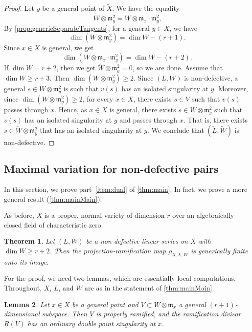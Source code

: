 \documentclass[11pt,reqno]{amsart}
\theoremstyle{plain}
\newtheorem{theorem}{Theorem}[section]
\newtheorem{lemma}[theorem]{Lemma}
\theoremstyle{definition}
\theoremstyle{remark}
\numberwithin{equation}{section}
\numberwithin{equation}{section}
\begin{document}
\begin{proof}
  Let $y$ be a general point of $\widetilde X$.
  We have the equality
  \[ \widetilde W \otimes \mathfrak m_y^2 = W \otimes \mathfrak m_x \cdot \mathfrak m_y^2. \]
  By \autoref{prop:genericSeparateTangents}, for a general $y \in X$, we have
  \[ \dim (W \otimes \mathfrak m_y^2) = \dim W - (r+1).\]
  Since $x \in X$ is general, we get
  \[ \dim (W \otimes \mathfrak m_x \cdot \mathfrak m_y^2) = \dim W - (r+2).\]
  If $\dim W = r+2$, then we get $\widetilde W \otimes \mathfrak m_y^2 = 0$, so we are done.
  Assume that $\dim W \geq r+3$.
  Then $\dim (W \otimes \mathfrak m_y^2) \geq 2$.
  Since $(L, W)$ is non-defective, a general $s \in W \otimes \mathfrak m_y^2$ is such that $v(s)$ has an isolated singularity at $y$.
  Moreover, since $\dim (W \otimes \mathfrak m_y^2) \geq 2$, for every $x \in X$, there exists $s \in V$ such that $v(s)$ passes through $x$.
  Hence, as $x \in X$ is general, there exists $s \in W \otimes \mathfrak m_y^2$ such that $v(s)$ has an isolated singularity at $y$ and passes through $x$.
  That is, there exists $s \in \widetilde W \otimes \mathfrak m_y^2 $ that has an isolated singularity at $y$.
  We conclude that $(\widetilde L, \widetilde W)$ is non-defective.
\end{proof}



\subsection{Maximal variation for non-defective pairs}\label{sec:nondefective}

In this section, we prove part~\eqref{item:dual} of \autoref{thm:main}.
In fact, we prove a more general result (\autoref{thm:mainMain}).

As before, $X$ is a proper, normal variety of dimension $r$ over an algebraically closed field of characteristic zero.
\begin{theorem}
  \label{thm:mainMain}
  Let $(L, W)$ be a non-defective linear series on $X$ with $\dim W \geq r+2$.
  Then the projection-ramification map $\rho_{X,L,W}$ is generically finite onto its image.
\end{theorem}

For the proof, we need two lemmas, which are essentially local computations.
Throughout, $X$, $L$, and $W$ are as in the statement of \autoref{thm:mainMain}.

\begin{lemma}\label{lem:tangentconeram}
  Let $x \in X$ be a general point and $V \subset W \otimes \mathfrak m_x$ a general $(r+1)$-dimensional subspace.
  Then $V$ is properly ramified, and the ramification divisor $R(V)$ has an ordinary double point singularity at $x$.
\end{lemma}
\end{document}
